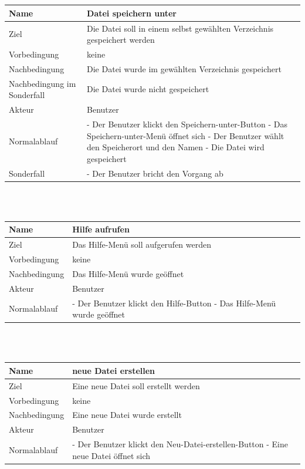 \documentclass[a4paper,10pt]{scrartcl}
\begin{document}
\\
\\
\begin{tabular}{|p{5cm}|p{10cm}|}
\hline Name & Datei speichern unter \\ 
\hline Ziel & Die Datei soll in einem selbst gewählten Verzeichnis gespeichert werden \\ 
\hline Vorbedingung & keine \\ 
\hline Nachbedingung & Die Datei wurde im gewählten Verzeichnis gespeichert \\ 
\hline Nachbedingung im Sonderfall & Die Datei wurde nicht gespeichert \\ 
\hline Akteur & Benutzer \\ 
\hline Normalablauf & - Der Benutzer klickt den Speichern-unter-Button
\newline 
- Das Speichern-unter-Menü öffnet sich
\newline
- Der Benutzer wählt den Speicherort und den Namen
\newline
- Die Datei wird gespeichert
\\ 
\hline Sonderfall & - Der Benutzer bricht den Vorgang ab \\ 
\hline 
\end{tabular} 
\\
\\
\begin{tabular}{|p{5cm}|p{10cm}|}
\hline Name & Hilfe aufrufen \\ 
\hline Ziel & Das Hilfe-Menü soll aufgerufen werden \\ 
\hline Vorbedingung & keine \\ 
\hline Nachbedingung & Das Hilfe-Menü wurde geöffnet \\ 
\hline Akteur & Benutzer \\ 
\hline Normalablauf & - Der Benutzer klickt den Hilfe-Button
\newline
- Das Hilfe-Menü wurde geöffnet \\ 
\hline 
\end{tabular} 
\\
\\
\begin{tabular}{|p{5cm}|p{10cm}|}
\hline Name & neue Datei erstellen \\ 
\hline Ziel & Eine neue Datei soll erstellt werden \\ 
\hline Vorbedingung & keine \\ 
\hline Nachbedingung & Eine neue Datei wurde erstellt \\ 
\hline Akteur & Benutzer \\ 
\hline Normalablauf & - Der Benutzer klickt den Neu-Datei-erstellen-Button
\newline
- Eine neue Datei öffnet sich
\\ 
\hline 
\end{tabular} 
\end{document}
